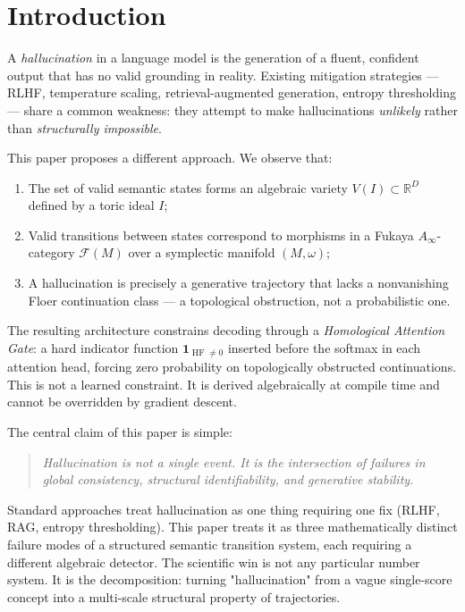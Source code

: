 \documentclass[11pt,a4paper]{article}
\DeclareMathOperator{\HF}{HF}
\newcommand{\one}{\mathbf{1}}
\newcommand{\Fuk}{\mathcal{F}}
\begin{document}
\section{Introduction}

A \emph{hallucination} in a language model is the generation of a
fluent, confident output that has no valid grounding in reality.
Existing mitigation strategies --- RLHF, temperature scaling,
retrieval-augmented generation, entropy thresholding --- share a
common weakness: they attempt to make hallucinations \emph{unlikely}
rather than \emph{structurally impossible}.

This paper proposes a different approach. We observe that:
\begin{enumerate}[label=(\roman*)]
  \item The set of valid semantic states forms an algebraic variety
        $V(I) \subset \mathbb{R}^D$ defined by a toric ideal $I$;
  \item Valid transitions between states correspond to morphisms in
        a Fukaya $A_\infty$-category $\Fuk(M)$ over a symplectic
        manifold $(M,\omega)$;
  \item A hallucination is precisely a generative trajectory that
        lacks a nonvanishing Floer continuation class --- a
        topological obstruction, not a probabilistic one.
\end{enumerate}

The resulting architecture constrains decoding through a
\emph{Homological Attention Gate}: a hard indicator function
$\one_{\HF \neq 0}$ inserted before the softmax in each attention
head, forcing zero probability on topologically obstructed
continuations. This is not a learned constraint. It is derived
algebraically at compile time and cannot be overridden by gradient
descent.

The central claim of this paper is simple:

\begin{quote}
\emph{Hallucination is not a single event.
It is the intersection of failures in global consistency,
structural identifiability, and generative stability.}
\end{quote}

Standard approaches treat hallucination as one thing requiring one fix
(RLHF, RAG, entropy thresholding).
This paper treats it as three mathematically distinct failure modes
of a structured semantic transition system, each requiring a different
algebraic detector.
The scientific win is not any particular number system.
It is the decomposition: turning "hallucination" from a vague
single-score concept into a multi-scale structural property of trajectories.
\end{document}
